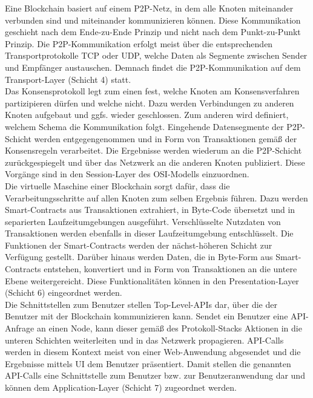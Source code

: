 Eine Blockchain basiert auf einem \ac{P2P}-Netz, in dem alle Knoten miteinander verbunden sind und miteinander kommunizieren können. Diese Kommunikation geschieht nach dem Ende-zu-Ende Prinzip und nicht nach dem Punkt-zu-Punkt Prinzip. Die \ac{P2P}-Kommunikation erfolgt meist über die entsprechenden Transportprotokolle TCP oder UDP, welche Daten als Segmente zwischen Sender und Empfänger austauschen. Demnach findet die \ac{P2P}-Kommunikation auf dem Transport-Layer (Schicht 4) statt.\\
Das Konsensprotokoll legt zum einen fest, welche Knoten am Konsensverfahren partizipieren dürfen und welche nicht. Dazu werden Verbindungen zu anderen Knoten aufgebaut und ggfs. wieder geschlossen. Zum anderen wird definiert, welchem Schema die Kommunikation folgt. Eingehende Datensegmente der \ac{P2P}-Schicht werden entgegengenommen und in Form von Transaktionen gemäß der Konsensregeln verarbeitet. Die Ergebnisse werden wiederum an die \ac{P2P}-Schicht zurückgespiegelt und über das Netzwerk an die anderen Knoten publiziert. Diese Vorgänge sind in den Session-Layer des \ac{OSI}-Modells einzuordnen.\\
Die virtuelle Maschine einer Blockchain sorgt dafür, dass die Verarbeitungsschritte auf allen Knoten zum selben Ergebnis führen. Dazu werden Smart-Contracts aus Transaktionen extrahiert, in Byte-Code übersetzt und in separierten Laufzeitumgebungen ausgeführt. Verschlüsselte Nutzdaten von Transaktionen werden ebenfalls in dieser Laufzeitumgebung entschlüsselt. Die Funktionen der Smart-Contracts werden der nächst-höheren Schicht zur Verfügung gestellt. Darüber hinaus werden Daten, die in Byte-Form aus Smart-Contracts entstehen, konvertiert und in Form von Transaktionen an die untere Ebene weitergereicht. Diese Funktionalitäten können in den Presentation-Layer (Schicht 6) eingeordnet werden.\\
Die Schnittstellen zum Benutzer stellen Top-Level-\acp{API} dar, über die der Benutzer mit der Blockchain kommunizieren kann. Sendet ein Benutzer eine API-Anfrage an einen Node, kann dieser gemäß des Protokoll-Stacks Aktionen in die unteren Schichten weiterleiten und in das Netzwerk propagieren. API-Calls werden in diesem Kontext meist von einer Web-Anwendung abgesendet und die Ergebnisse mittels \ac{UI} dem Benutzer präsentiert. Damit stellen die genannten API-Calls eine Schnittstelle zum Benutzer bzw. zur Benutzeranwendung dar und können dem Application-Layer (Schicht 7) zugeordnet werden.\\

